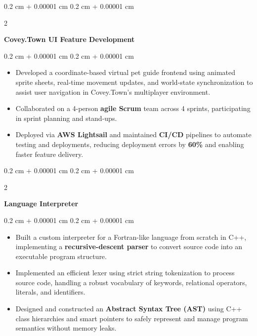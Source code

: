 \documentclass[10pt, letterpaper]{article}
\newenvironment{highlights}{
    \begin{itemize}[
        topsep=0.10 cm,
        parsep=0.10 cm,
        partopsep=0pt,
        itemsep=0pt,
        leftmargin=0.4 cm + 10pt
    ]
}{
    \end{itemize}
} %
\newenvironment{onecolentry}{
    \begin{adjustwidth}{
        0.2 cm + 0.00001 cm
    }{
        0.2 cm + 0.00001 cm
    }
}{
    \end{adjustwidth}
} %
\newenvironment{twocolentry}[2][]{
    \onecolentry
    \def\secondColumn{#2}
    \setcolumnwidth{\fill, 4.5 cm}
    \begin{paracol}{2}
}{
    \switchcolumn \raggedleft \secondColumn
    \end{paracol}
    \endonecolentry
} %
\begin{document}
        \vspace{0.2cm}

        \begin{twocolentry}{
            
            
        \textit{{}{}}}
            \textbf{Covey.Town UI Feature Development}
        \end{twocolentry}

        \vspace{0.10 cm}
        \begin{onecolentry}
            \begin{highlights}
                \item Developed a coordinate-based virtual pet guide frontend using animated sprite sheets, real-time movement updates, and world-state synchronization to assist user navigation in Covey.Town’s multiplayer environment.
                \item Collaborated on a 4-person \textbf{agile Scrum} team across 4 sprints, participating in sprint planning and stand-ups. 
                \item Deployed via \textbf{AWS Lightsail} and maintained \textbf{CI/CD} pipelines to automate testing and deployments, reducing deployment errors by \textbf{60\%} and enabling faster feature delivery.
            \end{highlights}
        \end{onecolentry}


        \vspace{0.2 cm}

           \begin{twocolentry}{
            
            
        \textit{{}{}}}
      \textbf{Language Interpreter}
        \end{twocolentry}

        

        \vspace{0.10 cm}
        \begin{onecolentry}
            \begin{highlights}
                \item Built a custom interpreter for a Fortran-like language from scratch in C++, implementing a \textbf{recursive-descent parser} to convert source code into an executable program structure.
                \item Implemented an efficient lexer using strict string tokenization to process source code, handling a robust vocabulary of keywords, relational operators, literals, and identifiers.
                \item Designed and constructed an \textbf{Abstract Syntax Tree (AST)} using C++ class hierarchies and smart pointers to safely represent and manage program semantics without memory leaks.

            \end{highlights}
        \end{onecolentry}
\end{document}
